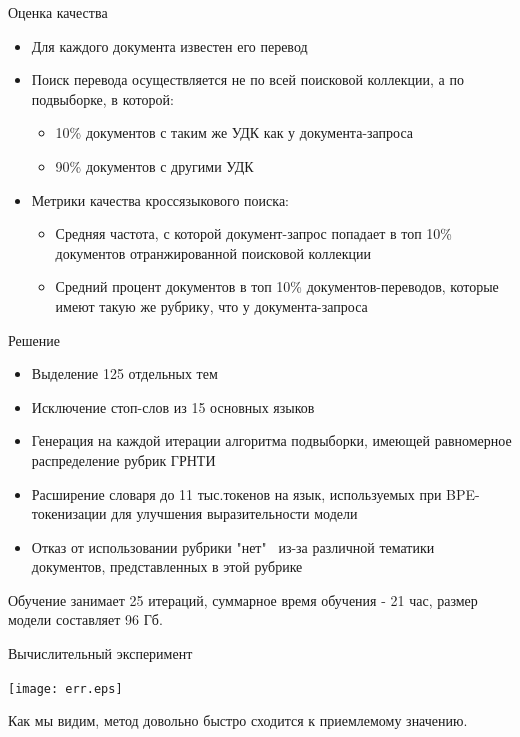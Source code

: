 \documentclass{beamer}
\begin{document}
\begin{frame}{Оценка качества}

\begin{itemize}
    \item Для каждого документа известен его перевод
    \item Поиск перевода осуществляется не по всей поисковой коллекции, а  по подвыборке, в которой:
        \begin{itemize}
            \item 10\% документов с таким же УДК как у документа-запроса 
            \item 90\% документов с другими УДК
        \end{itemize}
    \item Метрики качества кроссязыкового поиска:
    \begin{itemize}
        \item Средняя частота, с которой документ-запрос попадает в топ 10\% документов отранжированной поисковой коллекции
    
        \item Средний процент документов в топ 10\% документов-переводов, которые имеют такую же рубрику, что у документа-запроса
    \end{itemize}
\end{itemize}
\end{frame}


\begin{frame}{Решение}

\begin{itemize}
    \item Выделение 125 отдельных тем
    \item Исключение стоп-слов из 15 основных языков
    \item Генерация на каждой итерации алгоритма подвыборки, имеющей равномерное распределение рубрик ГРНТИ
    \item Расширение словаря до 11 тыс.токенов на язык, используемых при BPE-токенизации для улучшения выразительности модели
    \item Отказ от использовании рубрики "нет" \ из-за различной тематики документов, представленных в этой рубрике
\end{itemize}

\bigskip
Обучение занимает 25 итераций, суммарное время обучения - 21 час, размер модели составляет 96 Гб.

\end{frame}
\begin{frame}{Вычислительный эксперимент}


\texttt{[image: err.eps]}

\bigskip
Как мы видим, метод довольно быстро сходится к приемлемому значению.

\end{frame}
\end{document}

